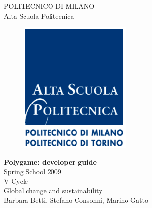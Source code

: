 \thispagestyle{empty}
\vspace*{-1.5cm} \bfseries{
\begin{center}
  \large
  POLITECNICO DI MILANO\\
  \normalsize
  Alta Scuola Politecnica\\
  \begin{figure}[htbp]
    \begin{center}
      \includegraphics[width=5.5cm]{../img/logoasp.png}
    \end{center}
  \end{figure}
  \vspace*{0.3cm} \LARGE



  \textbf{Polygame: developer guide}\\



  \vspace*{.75truecm} \large
  Spring School 2009 \\
  V Cycle \\
  Global change and sustainability\\
  Barbara Betti, Stefano Consonni, Marino Gatto
  
\end{center}
\vspace*{2.0cm} \large
\begin{flushleft}



\end{flushleft}
\begin{flushright}



\end{flushright}}
